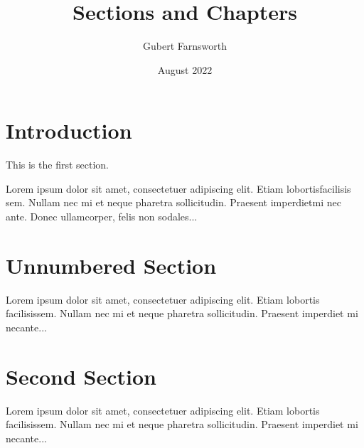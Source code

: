 \documentclass{article}
\title{Sections and Chapters}
\author{Gubert Farnsworth}
\date{August 2022}
\begin{document}
  
\maketitle
  
\tableofcontents

\section{Introduction}
   
This is the first section.
      
Lorem  ipsum  dolor  sit  amet,  consectetuer  adipiscing  
elit.   Etiam  lobortisfacilisis sem.  Nullam nec mi et 
neque pharetra sollicitudin.  Praesent imperdietmi nec ante. 
Donec ullamcorper, felis non sodales...
       
\section*{Unnumbered Section}

Lorem ipsum dolor sit amet, consectetuer adipiscing elit.  
Etiam lobortis facilisissem.  Nullam nec mi et neque pharetra 
sollicitudin.  Praesent imperdiet mi necante...

\section{Second Section}
       
Lorem ipsum dolor sit amet, consectetuer adipiscing elit.  
Etiam lobortis facilisissem.  Nullam nec mi et neque pharetra 
sollicitudin.  Praesent imperdiet mi necante...
\end{document}
